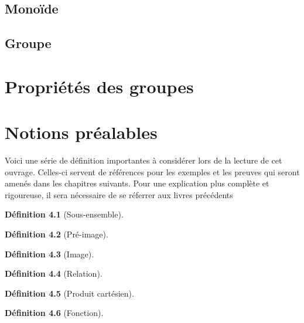 \documentclass[12pt]{book}
\theoremstyle{definition}
\newtheorem{definition}{Définition}[section]
\begin{document}
\section{Monoïde}
\section{Groupe}
\chapter{Propriétés des groupes}
\appendix
\chapter{Notions préalables}
Voici une série de définition importantes à considérer lors de la lecture de cet ouvrage. Celles-ci servent
de références pour les exemples et les preuves qui seront amenés dans les chapitres suivants. Pour une explication
plus complète et rigoureuse, il sera nécessaire de se réferrer aux livres précédents

\begin{definition}[Sous-ensemble]
    \label{def:sous_ensemble}
\end{definition}

\begin{definition}[Pré-image]
    \label{def:pre_image}
\end{definition}

\begin{definition}[Image]
    \label{def:image}
\end{definition}

\begin{definition}[Relation]
    \label{def:relation}
\end{definition}

\begin{definition}[Produit cartésien]
    \label{def:produit_cartesien}
\end{definition}

\begin{definition}[Fonction]
    \label{def:fonction}
\end{definition}
\end{document}
